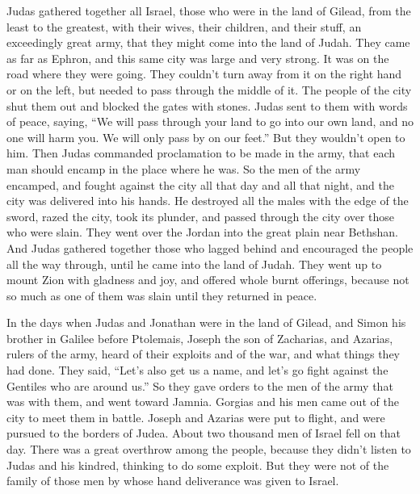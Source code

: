  Judas gathered together all Israel, those who were in the
land of Gilead, from the least to the greatest, with their wives, their
children, and their stuff, an exceedingly great army, that they might
come into the land of Judah.  They came as far as Ephron,
and this same city was large and very strong. It was on the road where
they were going. They couldn't turn away from it on the right hand or on
the left, but needed to pass through the middle of it.  The
people of the city shut them out and blocked the gates with stones.
 Judas sent to them with words of peace, saying, ``We will
pass through your land to go into our own land, and no one will harm
you. We will only pass by on our feet.'' But they wouldn't open to him.
 Then Judas commanded proclamation to be made in the army,
that each man should encamp in the place where he was.  So
the men of the army encamped, and fought against the city all that day
and all that night, and the city was delivered into his hands.
 He destroyed all the males with the edge of the sword,
razed the city, took its plunder, and passed through the city over those
who were slain.  They went over the Jordan into the great
plain near Bethshan.  And Judas gathered together those who
lagged behind and encouraged the people all the way through, until he
came into the land of Judah.  They went up to mount Zion
with gladness and joy, and offered whole burnt offerings, because not so
much as one of them was slain until they returned in peace.

 In the days when Judas and Jonathan were in the land of
Gilead, and Simon his brother in Galilee before Ptolemais, 
Joseph the son of Zacharias, and Azarias, rulers of the army, heard of
their exploits and of the war, and what things they had done.
 They said, ``Let's also get us a name, and let's go fight
against the Gentiles who are around us.''  So they gave
orders to the men of the army that was with them, and went toward
Jamnia.  Gorgias and his men came out of the city to meet
them in battle.  Joseph and Azarias were put to flight, and
were pursued to the borders of Judea. About two thousand men of Israel
fell on that day.  There was a great overthrow among the
people, because they didn't listen to Judas and his kindred, thinking to
do some exploit.  But they were not of the family of those
men by whose hand deliverance was given to Israel.


